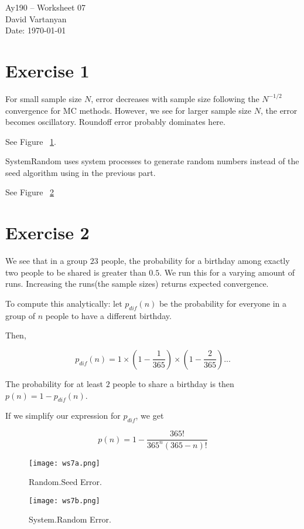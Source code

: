 \documentclass[11pt,letterpaper]{article}
\begin{document}
\begin{center}
\Large
Ay190 -- Worksheet 07\\
David Vartanyan\\
Date: \today
\end{center}

\section{Exercise 1}


For small sample size $N$, error decreases with sample size following the $N^{-1/2}$ convergence for MC methods. However, we see for larger sample size $N$, the error becomes oscillatory. Roundoff error probably dominates here.

See Figure ~\ref{fig:1}.

SystemRandom uses system processes to generate random numbers instead of the seed algorithm using in the previous part. 

See Figure ~\ref{fig:2}

\section{Exercise 2}

We see that in a group $23$ people, the probability for a birthday among exactly two people to be shared is greater than $0.5$. We run this for a varying amount of runs. Increasing the runs(the sample sizes) returns expected convergence.

To compute this analytically: let $p_{dif}(n)$ be the probability for everyone in a group of $n$ people to have a different birthday.

Then, 

\begin{equation}
p_{dif}(n)=1\times(1-\frac{1}{365})\times(1-\frac{2}{365})...
\end{equation}

The probability for at least $2$ people to share a birthday is then $p(n)=1-p_{dif}(n)$.

If we simplify our expression for $p_{dif}$, we get

\begin{equation}
p(n)=1-\frac{365!}{365^{n}(365-n)!}
\end{equation}

\begin{figure}[bth]
\centering
\texttt{[image: ws7a.png]}
\caption{Random.Seed Error.}
\label{fig:1}
\end{figure}

\begin{figure}[bth]
\centering
\texttt{[image: ws7b.png]}
\caption{System.Random Error.}
\label{fig:2}
\end{figure}
\end{document}
